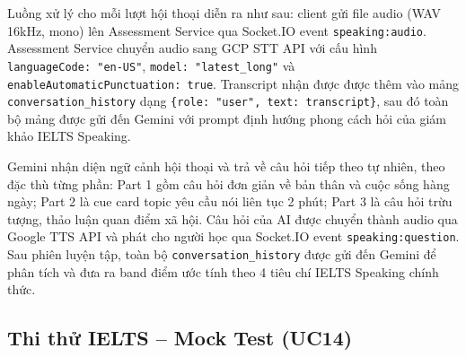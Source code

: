 \documentclass[a4paper,12pt]{extreport}
\begin{document}
Luồng xử lý cho mỗi lượt hội thoại diễn ra như sau: client gửi file audio (WAV 16kHz, mono) lên Assessment Service qua Socket.IO event \texttt{speaking:audio}. Assessment Service chuyển audio sang GCP STT API với cấu hình \texttt{languageCode: "en-US"}, \texttt{model: "latest\_long"} và \texttt{enableAutomaticPunctuation: true}. Transcript nhận được được thêm vào mảng \texttt{conversation\_history} dạng \texttt{\{role: "user", text: transcript\}}, sau đó toàn bộ mảng được gửi đến Gemini với prompt định hướng phong cách hỏi của giám khảo IELTS Speaking.

Gemini nhận diện ngữ cảnh hội thoại và trả về câu hỏi tiếp theo tự nhiên, theo đặc thù từng phần: Part 1 gồm câu hỏi đơn giản về bản thân và cuộc sống hàng ngày; Part 2 là cue card topic yêu cầu nói liên tục 2 phút; Part 3 là câu hỏi trừu tượng, thảo luận quan điểm xã hội. Câu hỏi của AI được chuyển thành audio qua Google TTS API và phát cho người học qua Socket.IO event \texttt{speaking:question}. Sau phiên luyện tập, toàn bộ \texttt{conversation\_history} được gửi đến Gemini để phân tích và đưa ra band điểm ước tính theo 4 tiêu chí IELTS Speaking chính thức.

\subsection{Thi thử IELTS -- Mock Test (UC14)}
\end{document}
